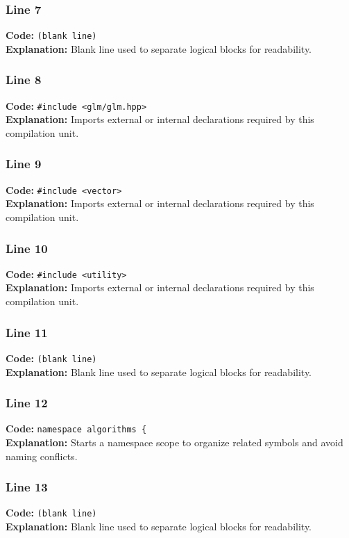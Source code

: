 \documentclass[11pt,a4paper]{article}
\begin{document}
\subsubsection*{Line 7}
\textbf{Code:} \texttt{(blank line)}\\
\textbf{Explanation:} Blank line used to separate logical blocks for readability.

\subsubsection*{Line 8}
\textbf{Code:} \verb|#include <glm/glm.hpp>|\\
\textbf{Explanation:} Imports external or internal declarations required by this compilation unit.

\subsubsection*{Line 9}
\textbf{Code:} \verb|#include <vector>|\\
\textbf{Explanation:} Imports external or internal declarations required by this compilation unit.

\subsubsection*{Line 10}
\textbf{Code:} \verb|#include <utility>|\\
\textbf{Explanation:} Imports external or internal declarations required by this compilation unit.

\subsubsection*{Line 11}
\textbf{Code:} \texttt{(blank line)}\\
\textbf{Explanation:} Blank line used to separate logical blocks for readability.

\subsubsection*{Line 12}
\textbf{Code:} \verb|namespace algorithms {|\\
\textbf{Explanation:} Starts a namespace scope to organize related symbols and avoid naming conflicts.

\subsubsection*{Line 13}
\textbf{Code:} \texttt{(blank line)}\\
\textbf{Explanation:} Blank line used to separate logical blocks for readability.
\end{document}
